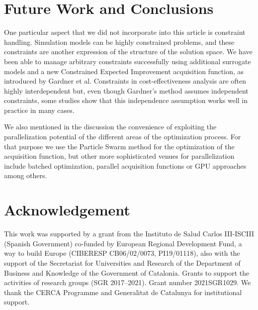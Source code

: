 \documentclass{IOS-Book-Article}
\begin{document}
	
\section{Future Work and Conclusions}
One particular aspect that we did not incorporate into this article is constraint handling. Simulation models can be highly constrained problems, and these constraints are another expression of the structure of the solution space. We have been able to manage arbitrary constraints successfully using additional surrogate models and a new Constrained Expected Improvement acquisition function, as introduced by Gardner et al\cite{gp-constraints}. Constraints in cost-effectiveness analysis are often highly interdependent but, even though Gardner's method assumes independent constraints, some studies show that this independence assumption works well in practice in many cases\cite{bo-constraint-dependence}.

We also mentioned in the discussion the convenience of exploiting the parallelization potential of the different areas of the optimization process. For that purpose we use the Particle Swarm method for the optimization of the acquisition function, but other more sophisticated venues for parallelization include batched optimization\cite{gp-batch}, parallel acquisition functions\cite{gp-parallel-acq-func} or GPU approaches\cite{gp-gpu} among others.
	
\section{Acknowledgement}
This work was supported by a grant from the Instituto de Salud Carlos III-ISCIII (Spanish Government) co-funded by European Regional Development Fund, a way to build Europe (CIBERESP CB06/02/0073, PI19/01118), also with the support of the Secretariat for Universities and Research of the Department of Business and Knowledge of the Government of Catalonia. Grants to support the activities of research groups (SGR 2017–2021). Grant number 2021SGR1029. We thank the CERCA Programme and Generalitat de Catalunya for institutional support.
	
	
	
\end{document}
